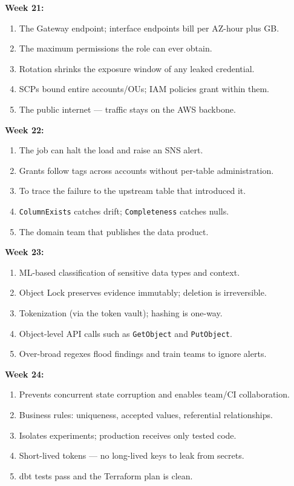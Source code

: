 \documentclass[11pt, a4paper]{article}
\begin{document}
\noindent\textbf{Week 21:}
\begin{enumerate}[itemsep=0pt, leftmargin=2em]
    \item The Gateway endpoint; interface endpoints bill per AZ-hour plus GB.
    \item The maximum permissions the role can ever obtain.
    \item Rotation shrinks the exposure window of any leaked credential.
    \item SCPs bound entire accounts/OUs; IAM policies grant within them.
    \item The public internet --- traffic stays on the AWS backbone.
\end{enumerate}
\noindent\textbf{Week 22:}
\begin{enumerate}[itemsep=0pt, leftmargin=2em]
    \item The job can halt the load and raise an SNS alert.
    \item Grants follow tags across accounts without per-table administration.
    \item To trace the failure to the upstream table that introduced it.
    \item \texttt{ColumnExists} catches drift; \texttt{Completeness} catches nulls.
    \item The domain team that publishes the data product.
\end{enumerate}
\noindent\textbf{Week 23:}
\begin{enumerate}[itemsep=0pt, leftmargin=2em]
    \item ML-based classification of sensitive data types and context.
    \item Object Lock preserves evidence immutably; deletion is irreversible.
    \item Tokenization (via the token vault); hashing is one-way.
    \item Object-level API calls such as \texttt{GetObject} and \texttt{PutObject}.
    \item Over-broad regexes flood findings and train teams to ignore alerts.
\end{enumerate}
\noindent\textbf{Week 24:}
\begin{enumerate}[itemsep=0pt, leftmargin=2em]
    \item Prevents concurrent state corruption and enables team/CI collaboration.
    \item Business rules: uniqueness, accepted values, referential relationships.
    \item Isolates experiments; production receives only tested code.
    \item Short-lived tokens --- no long-lived keys to leak from secrets.
    \item dbt tests pass and the Terraform plan is clean.
\end{enumerate}
\end{document}
